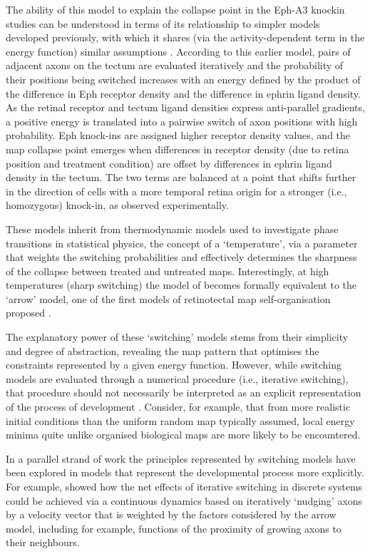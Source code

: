 \documentclass[9pt,lineno,draft]{elife}
\begin{document}
The ability of this model to explain the collapse point in the Eph-A3 knockin studies can be understood in terms of its relationship to simpler models developed previously, with which it shares (via the activity-dependent term in the energy function) similar assumptions \citep{Koulakov2004}. According to this earlier model, pairs of adjacent axons on the tectum are evaluated iteratively and the probability of their positions being switched increases with an energy defined by the product of the difference in Eph receptor density and the difference in ephrin ligand density. As the retinal receptor and tectum ligand densities express anti-parallel gradients, a positive energy is translated into a pairwise switch of axon positions with high probability. Eph knock-ins are assigned higher receptor density values, and the map collapse point emerges when differences in receptor density (due to retina position and treatment condition) are offset by differences in ephrin ligand density in the tectum. The two terms are balanced at a point that shifts further in the direction of cells with a more temporal retina origin for a stronger (i.e., homozygous) knock-in, as observed experimentally.

These models inherit from thermodynamic models used to investigate phase transitions in statistical physics, the concept of a `temperature', via a parameter that weights the switching probabilities and effectively determines the sharpness of the collapse between treated and untreated maps. Interestingly, at high temperatures (sharp switching) the model of \cite{Koulakov2004} becomes formally equivalent to the `arrow’ model, one of the first models of retinotectal map self-organisation proposed  \citep{Hope1976}.

The explanatory power of these `switching' models stems from their simplicity and degree of abstraction, revealing the map pattern that optimises the constraints represented by a given energy function. However, while switching models are evaluated through a numerical procedure (i.e., iterative switching), that procedure should not necessarily be interpreted as an explicit representation of the process of development \citep{Wilson2015}. Consider, for example, that from more realistic initial conditions than the uniform random map typically assumed, local energy minima quite unlike organised biological maps are more likely to be encountered.

In a parallel strand of work the principles represented by switching models have been explored in models that represent the developmental process more explicitly. For example, \cite{Overton1982} showed how the net effects of iterative switching in discrete systems could be achieved via a continuous dynamics based on iteratively ‘nudging’ axons by a velocity vector that is weighted by the factors considered by the arrow model, including for example, functions of the proximity of growing axons to their neighbours.
\end{document}
